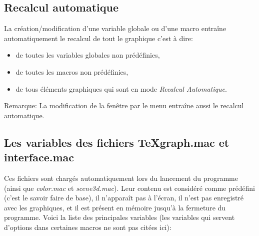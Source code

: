  
\subsection{Recalcul automatique}

La création/modification d'une variable globale ou d'une macro entraîne automatiquement le recalcul de tout le graphique c'est à dire:

\begin{itemize}
\item de toutes les variables globales non prédéfinies,
\item de toutes les macros non prédéfinies,
\item de tous éléments graphiques qui sont en mode \textsl{Recalcul Automatique}. 
\end{itemize}

Remarque: La modification de la fenêtre par le menu entraîne aussi le recalcul automatique.

\subsection{Les variables des fichiers TeXgraph.mac et interface.mac}

Ces fichiers sont chargés automatiquement lors du lancement du programme (ainsi que \textit{color.mac} et \textit{scene3d.mac}). Leur contenu est considéré comme prédéfini (c'est le savoir faire de base), il n'apparaît pas à l'écran, il n'est pas enregistré avec les graphiques, et il est présent en mémoire jusqu'à la fermeture du programme. Voici la liste des principales variables (les variables qui servent d'options dans certaines macros ne sont pas citées ici):


